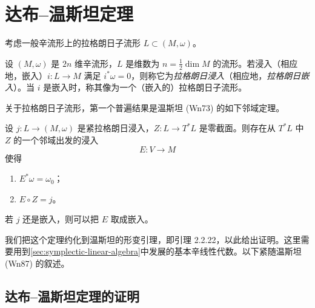 \section{达布--温斯坦定理}
\label{sec:darboux-weinstein}

考虑一般辛流形上的拉格朗日子流形 $L\subset(M,\omega)$。

\begin{definition}\label{def:lagrangian-immersion-embedding}
设 $(M,\omega)$ 是 $2n$ 维辛流形，$L$ 是维数为
$n=\frac12\dim M$ 的流形。若浸入（相应地，嵌入）$i:L\to M$ 满足
$i^*\omega=0$，则称它为\emph{拉格朗日浸入}（相应地，\emph{拉格朗日嵌入}）。当 $i$ 是嵌入时，称其像为一个（嵌入的）拉格朗日子流形。
\end{definition}

关于拉格朗日子流形，第一个普遍结果是温斯坦 (Wn73) 的如下邻域定理。

\begin{theorem}[达布--温斯坦定理]\label{thm:darboux-weinstein}
设 $j:L\to(M,\omega)$ 是紧拉格朗日浸入，$Z:L\to T^*L$ 是零截面。则存在从 $T^*L$ 中 $Z$ 的一个邻域出发的浸入
\[
 E:V\longrightarrow M
\]
使得
\begin{enumerate}[label=(\arabic*)]
\item $E^*\omega=\omega_0$；
\item $E\circ Z=j$。
\end{enumerate}
若 $j$ 还是嵌入，则可以把 $E$ 取成嵌入。
\end{theorem}

我们把这个定理约化到温斯坦的形变引理，即引理 2.2.22，以此给出证明。这里需要用到\cref{sec:symplectic-linear-algebra}中发展的基本辛线性代数。以下紧随温斯坦 (Wn87) 的叙述。

\subsection{达布--温斯坦定理的证明}
\label{subsec:proof-darboux-weinstein}

